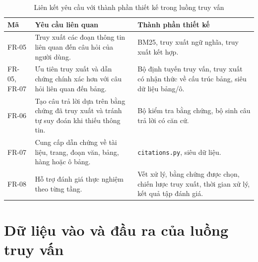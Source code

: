 \documentclass[../DoAn.tex]{subfiles}
\begin{document}
\begin{table}[H]
\centering
\small
\renewcommand{\arraystretch}{1.2}
\caption{Liên kết yêu cầu với thành phần thiết kế trong luồng truy vấn}
\label{tab:query-traceability}
\begin{tabularx}{\textwidth}{
    |>{\raggedright\arraybackslash}p{}
    |>{\raggedright\arraybackslash}X
    |>{\raggedright\arraybackslash}p{}|
}
\hline
\textbf{Mã} & \textbf{Yêu cầu liên quan} & \textbf{Thành phần thiết kế} \\
\hline
FR-05 &
Truy xuất các đoạn thông tin liên quan đến câu hỏi của người dùng. &
BM25, truy xuất ngữ nghĩa, truy xuất kết hợp. \\
\hline
FR-05, FR-07 &
Ưu tiên truy xuất và dẫn chứng chính xác hơn với câu hỏi liên quan đến bảng. &
Bộ định tuyến truy vấn, truy xuất có nhận thức về cấu trúc bảng, siêu dữ liệu bảng/ô. \\
\hline
FR-06 &
Tạo câu trả lời dựa trên bằng chứng đã truy xuất và tránh tự suy đoán khi thiếu
thông tin. &
Bộ kiểm tra bằng chứng, bộ sinh câu trả lời có căn cứ. \\
\hline
FR-07 &
Cung cấp dẫn chứng về tài liệu, trang, đoạn văn, bảng, hàng hoặc ô bảng. &
\texttt{citations.py}, siêu dữ liệu. \\
\hline
FR-08 &
Hỗ trợ đánh giá thực nghiệm theo từng tầng. &
Vết xử lý, bằng chứng được chọn, chiến lược truy xuất, thời gian xử lý, kết quả tập đánh giá. \\
\hline
\end{tabularx}
\end{table}

\section{Dữ liệu vào và đầu ra của luồng truy vấn}
\label{section:query-input-output}
\end{document}
